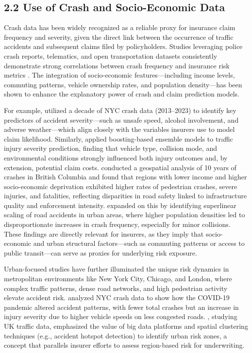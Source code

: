 \documentclass[
  number,
  review,
  3p]{elsarticle}
\begin{document}
\subsection{\texorpdfstring{\textbf{2.2 Use of Crash and Socio-Economic
Data}}{2.2 Use of Crash and Socio-Economic Data}}\label{use-of-crash-and-socio-economic-data}

Crash data has been widely recognized as a reliable proxy for insurance
claim frequency and severity, given the direct link between the
occurrence of traffic accidents and subsequent claims filed by
policyholders. Studies leveraging police crash reports, telematics, and
open transportation datasets consistently demonstrate strong
correlations between crash frequency and insurance risk metrics
\citep{takale}. The integration of socio-economic features---including
income levels, commuting patterns, vehicle ownership rates, and
population density---has been shown to enhance the explanatory power of
crash and claim prediction models.

For example, \citep{adeniyi} utilized a decade of NYC crash data
(2013--2023) to identify key predictors of accident severity---such as
unsafe speed, alcohol involvement, and adverse weather---which align
closely with the variables insurers use to model claim likelihood.
Similarly, \citep{dong} applied boosting-based ensemble models to
traffic injury severity prediction, finding that vehicle type, collision
mode, and environmental conditions strongly influenced both injury
outcomes and, by extension, potential claim costs. \citep{brubacher}
conducted a geospatial analysis of 10 years of crashes in British
Columbia and found that regions with lower income and higher
socio-economic deprivation exhibited higher rates of pedestrian crashes,
severe injuries, and fatalities, reflecting disparities in road safety
linked to infrastructure quality and enforcement intensity.
\citep{cabrera} expanded on this by identifying superlinear scaling of
road accidents in urban areas, where higher population densities led to
disproportionate increases in crash frequency, especially for minor
collisions. These findings are directly relevant for insurers, as they
imply that socio-economic and urban structural factors---such as
commuting patterns or access to public transit---can serve as proxies
for underlying risk exposure.

Urban-focused studies have further illuminated the unique risk dynamics
in metropolitan environments like New York City, Chicago, and London,
where complex traffic patterns, dense road networks, and high pedestrian
activity elevate accident risk. \citep{adeniyi} analyzed NYC crash data
to show how the COVID-19 pandemic altered accident patterns, with fewer
total crashes but an increase in injury severity due to higher vehicle
speeds on less congested roads. \citep{feng}, studying UK traffic data,
emphasized the value of big data platforms and spatial clustering
techniques (e.g., accident hotspot detection) to identify urban risk
zones, a concept that parallels insurer efforts to assess region-based
risk for underwriting.
\end{document}
